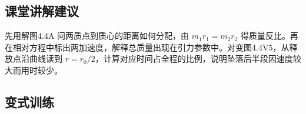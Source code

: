\documentclass[UTF8,fontset=fandol,a4paper,11pt]{ctexart}
\begin{document}


\subsection*{课堂讲解建议}

先用解图4.4A 问两质点到质心的距离如何分配，由 $m_1r_1=m_2r_2$ 得质量反比。再在相对方程中标出两加速度，解释总质量出现在引力参数中。对变图4.4V5，从释放点沿曲线读到 $r=r_0/2$，计算对应时间占全程的比例，说明坠落后半段因速度较大而用时较少。



\subsection*{变式训练}
\end{document}
